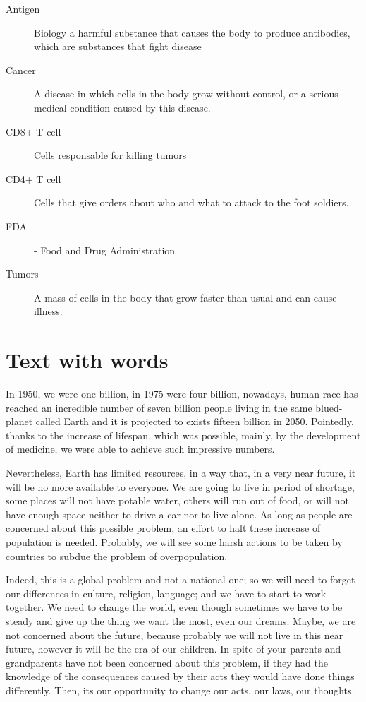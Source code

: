 \documentclass[a4paper,12pt]{article}
\begin{document}
\begin{description}
\item[Antigen]  Biology a  harmful substance  that  causes the  body to  produce
  antibodies, which are substances that fight disease
\item[Cancer] A disease in which cells in the body grow without control, or a serious medical condition caused by this disease.
\item[CD8+ T cell] Cells responsable for killing tumors
\item[CD4+ T cell] Cells that give orders about who and what to  attack to the
  foot soldiers.
\item[FDA] - Food and Drug Administration
\item[Tumors] A mass  of cells in the  body that grow faster than  usual and can
  cause illness.
\end{description}


%
%
\newpage


\section{Text with words}

In 1950, we were one billion, in 1975 were four billion, nowadays, human race has reached an incredible number of seven billion people
living  in the  same blued-planet  called Earth  and it  is projected  to exists fifteen
billion in 2050.  {\color{red}Pointedly}, thanks to the increase
of  {\color{red}lifespan}, which was possible, mainly, by the development of medicine, we were
able to achieve such impressive numbers.

Nevertheless, Earth has limited resources, in a way that, in a very near future, it
will  be no  more available  to everyone.  We  are going  to live  in period  of
shortage, some places will not have potable water, others will run out of food,
or will not have enough space neither to  drive a car nor to live alone. As long
as   people  are   concerned  about   this  possible   problem,  an   effort  to
{\color{red}halt} these increase of population  is needed. Probably, we will see
some {\color{red}harsh} actions to be taken by countries to {\color{red}subdue} the problem of overpopulation.

 Indeed, this is  a global problem and not a national  one; so we will
need to  forget our differences in  culture, religion, language; and  we have to
start to work together. We need to change the world, even though sometimes we have to be steady and give up the thing we
want the  most, even our  dreams. Maybe, we  are not concerned about  the future,
because probably we will not live in this near future, however it will be the era
of our children. In spite of your parents and grandparents have not been concerned
about this  problem, if  they had  the knowledge of  the consequences  caused by
their acts they would have done things differently. Then, its our opportunity to
change our acts, our laws, our thoughts.
\end{document}
